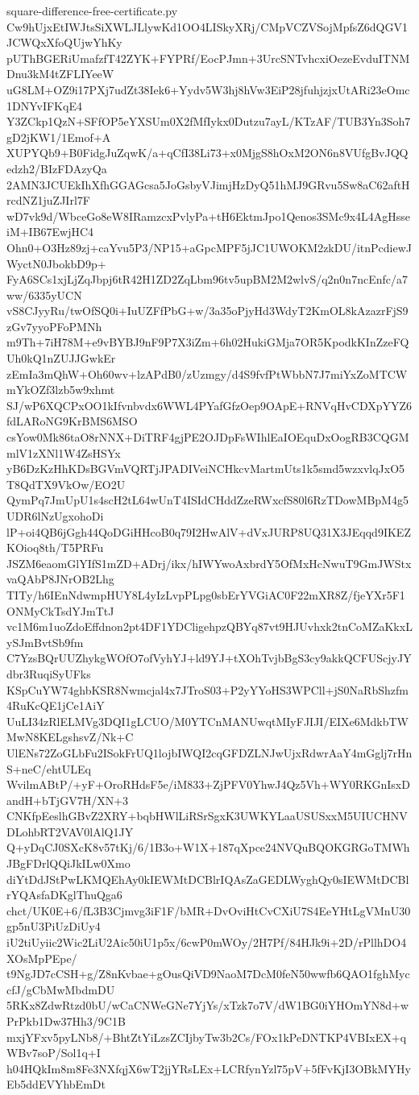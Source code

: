 \documentclass[11pt]{article}
\theoremstyle{definition}
\theoremstyle{remark}
\begin{document}
\begin{filecontents*}[overwrite]{square-difference-free-certificate.py}
Cw9hUjxEtIWJtsSiXWLJLlywKd1OO4LISkyXRj/CMpVCZVSojMpfsZ6dQGV1JCWQxXfoQUjwYhKy
pUThBGERiUmafzfT42ZYK+FYPRf/EocPJmn+3UrcSNTvhcxiOezeEvduITNMDnu3kM4tZFLIYeeW
uG8LM+OZ9i17PXj7udZt38Iek6+Yydv5W3hj8hVw3EiP28jfuhjzjxUtARi23eOmc1DNYvIFKqE4
Y3ZCkp1QzN+SFfOP5eYXSUm0X2fMfIykx0Dutzu7ayL/KTzAF/TUB3Yn3Soh7gD2jKW1/1Emof+A
XUPYQb9+B0FidgJuZqwK/a+qCfI38Li73+x0MjgS8hOxM2ON6n8VUfgBvJQQedzh2/BIzFDAzyQa
2AMN3JCUEkIhXfhGGAGcsa5JoGsbyVJimjHzDyQ51hMJ9GRvu5Sw8aC62aftHrcdNZ1juZJIrl7F
wD7vk9d/WbceGo8eW8IRamzcxPvlyPa+tH6EktmJpo1Qenos3SMc9x4L4AgHsseiM+IB67EwjHC4
Ohn0+O3Hz89zj+caYvu5P3/NP15+aGpcMPF5jJC1UWOKM2zkDU/itnPcdiewJWyctN0JbokbD9p+
FyA6SCs1xjLjZqJbpj6tR42H1ZD2ZqLbm96tv5upBM2M2wlvS/q2n0n7ncEnfc/a7ww/6335yUCN
vS8CJyyRu/twOfSQ0i+IuUZFfPbG+w/3a35oPjyHd3WdyT2KmOL8kAzazrFjS9zGv7yyoPFoPMNh
m9Th+7iH78M+e9vBYBJ9nF9P7X3iZm+6h02HukiGMja7OR5KpodkKInZzeFQUh0kQ1nZUJJGwkEr
zEmIa3mQhW+Oh60wv+lzAPdB0/zUzmgy/d4S9fvfPtWbbN7J7miYxZoMTCWmYkOZf3lzb5w9xhmt
SJ/wP6XQCPxOO1kIfvnbvdx6WWL4PYafGfzOep9OApE+RNVqHvCDXpYYZ6fdLARoNG9KrBMS6MSO
csYow0Mk86taO8rNNX+DiTRF4gjPE2OJDpFsWIhlEaIOEquDxOogRB3CQGMmlV1zXNl1W4ZsHSYx
yB6DzKzHhKDsBGVmVQRTjJPADIVeiNCHkcvMartmUts1k5smd5wzxvlqJxO5T8QdTX9VkOw/EO2U
QymPq7JmUpU1s4scH2tL64wUnT4ISIdCHddZzeRWxcfS80l6RzTDowMBpM4g5UDR6lNzUgxohoDi
lP+oi4QB6jGgh44QoDGiHHcoB0q79I2HwAlV+dVxJURP8UQ31X3JEqqd9IKEZKOioq8th/T5PRFu
JSZM6eaomGlYIfS1mZD+ADrj/ikx/hIWYwoAxbrdY5OfMxHcNwuT9GmJWStxvaQAbP8JNrOB2Lhg
TITy/h6IEnNdwmpHUY8L4yIzLvpPLpg0sbErYVGiAC0F22mXR8Z/fjeYXr5F1ONMyCkTsdYJmTtJ
vc1M6m1uoZdoEffdnon2pt4DF1YDCligehpzQBYq87vt9HJUvhxk2tnCoMZaKkxLySJmBvtSb9fm
C7YzsBQrUUZhykgWOfO7ofVyhYJ+ld9YJ+tXOhTvjbBgS3cy9akkQCFUScjyJYdbr3RuqiSyUFks
KSpCuYW74ghbKSR8Nwmcjal4x7JTroS03+P2yYYoHS3WPCll+jS0NaRbShzfm4RuKcQE1jCe1AiY
UuLI34zRlELMVg3DQI1gLCUO/M0YTCnMANUwqtMIyFJIJI/EIXe6MdkbTWMwN8KELgshsvZ/Nk+C
UlENs72ZoGLbFu2ISokFrUQ1lojbIWQI2cqGFDZLNJwUjxRdwrAaY4mGglj7rHnS+neC/ehtULEq
WvilmABtP/+yF+OroRHdsF5e/iM833+ZjPFV0YhwJ4Qz5Vh+WY0RKGnIsxDandH+bTjGV7H/XN+3
CNKfpEeslhGBvZ2XRY+bqbHWlLiRSrSgxK3UWKYLaaUSUSxxM5UIUCHNVDLohbRT2VAV0lAlQ1JY
Q+yDqCJ0SXcK8v57tKj/6/1B3o+W1X+187qXpce24NVQuBQOKGRGoTMWhJBgFDrlQQiJkILw0Xmo
diYtDdJStPwLKMQEhAy0kIEWMtDCBlrIQAsZaGEDLWyghQy0sIEWMtDCBlrYQAsfaDKglThuQga6
chct/UK0E+6/fL3B3Cjmvg3iF1F/bMR+DvOviHtCvCXiU7S4EeYHtLgVMnU30gp5nU3PiUzDiUy4
iU2tiUyiic2Wic2LiU2Aic50iU1p5x/6cwP0mWOy/2H7Pf/84HJk9i+2D/rPllhDO4XOsMpPEpe/
t9NgJD7cCSH+g/Z8nKvbae+gOusQiVD9NaoM7DcM0feN50wwfb6QAO1fghMyccfJ/gCbMwMbdmDU
5RKx8ZdwRtzd0bU/wCaCNWeGNe7YjYs/xTzk7o7V/dW1BG0iYHOmYN8d+wPrPkb1Dw37Hh3/9C1B
mxjYFxv5pyLNb8/+BhtZtYiLzsZCIjbyTw3b2Cs/FOx1kPeDNTKP4VBIxEX+qWBv7soP/Sol1q+I
h04HQkIm8m8Fe3NXfqjX6wT2jjYRsLEx+LCRfynYzl75pV+5fFvKjI3OBkMYHyEb5ddEVYhbEmDt

\end{filecontents*}
\end{document}
